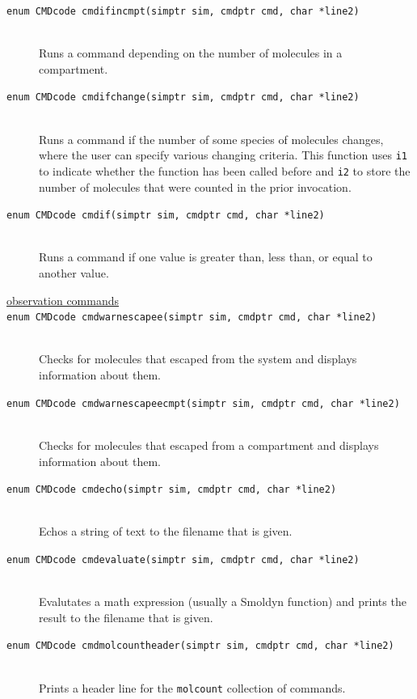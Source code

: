 \documentclass {scrbook}
\newcommand {\ttt} {\texttt}
\begin{document}
\begin{description}
\item[\ttt{enum CMDcode cmdifincmpt(simptr sim, cmdptr cmd, char *line2)}]
\hfill \\
Runs a command depending on the number of molecules in a compartment.

\item[\ttt{enum CMDcode cmdifchange(simptr sim, cmdptr cmd, char *line2)}]
\hfill \\
Runs a command if the number of some species of molecules changes, where the user can specify various changing criteria. This function uses \ttt{i1} to indicate whether the function has been called before and \ttt{i2} to store the number of molecules that were counted in the prior invocation.

\item[\ttt{enum CMDcode cmdif(simptr sim, cmdptr cmd, char *line2)}]
\hfill \\
Runs a command if one value is greater than, less than, or equal to another value.

\item[\underline{observation commands}]

\item[\ttt{enum CMDcode cmdwarnescapee(simptr sim, cmdptr cmd, char *line2)}]
\hfill \\
Checks for molecules that escaped from the system and displays information about them.

\item[\ttt{enum CMDcode cmdwarnescapeecmpt(simptr sim, cmdptr cmd, char *line2)}]
\hfill \\
Checks for molecules that escaped from a compartment and displays information about them.

\item[\ttt{enum CMDcode cmdecho(simptr sim, cmdptr cmd, char *line2)}]
\hfill \\
Echos a string of text to the filename that is given.

\item[\ttt{enum CMDcode cmdevaluate(simptr sim, cmdptr cmd, char *line2)}]
\hfill \\
Evalutates a math expression (usually a Smoldyn function) and prints the result to the filename that is given.

\item[\ttt{enum CMDcode cmdmolcountheader(simptr sim, cmdptr cmd, char *line2)}]
\hfill \\
Prints a header line for the \ttt{molcount} collection of commands.


\end{description}
\end{document}
